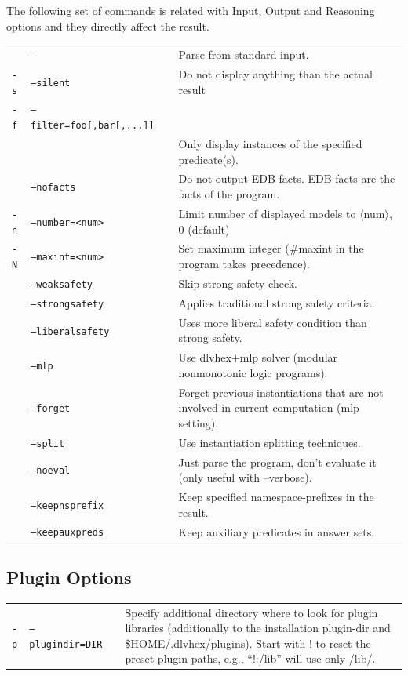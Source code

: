 \documentclass[a4paper, titlepage]{article}
\begin{document}
\bigskip
The following set of commands is related with Input, Output and  Reasoning options and they directly affect the result.
\renewcommand{\arraystretch}{1.6}
\begin{longtable}{p{2.2cm}  p{2.5cm} p{0.6cm} p{6.3cm}  } 
 & \texttt{--}& & Parse from standard input. \\ 
\texttt{-s} & \texttt{--silent}&& Do not display anything than the actual result \\ 
\texttt{-f} & \texttt{--filter=foo[,bar[,...]]} && \\
& & & Only display instances of the specified predicate(s).\\
& \texttt{--nofacts} && Do not output EDB facts. EDB facts are the facts of the program.  \\
\texttt{-n} & \texttt{--number=<num>} && Limit number of displayed models to $\langle$num$\rangle$, 0 (default)\\ 
\texttt{-N} & \texttt{--maxint=<num>} && Set maximum integer (\#maxint in the program takes precedence). \\
 & \texttt{--weaksafety} && Skip strong safety check.\\
 & \texttt{--strongsafety} && Applies traditional strong safety criteria. \\
  & \texttt{--liberalsafety} && Uses more liberal safety condition than strong safety. \\
  &\texttt{--mlp}&& Use dlvhex$+$mlp solver (modular nonmonotonic logic programs).\\
  & \texttt{--forget} && Forget previous instantiations that are not involved in current computation (mlp setting). \\
  & \texttt{--split} &&Use instantiation splitting techniques.\\
  & \texttt{--noeval} && Just parse the program, don't evaluate it (only useful with --verbose). \\
  & \texttt{--keepnsprefix} && Keep specified namespace-prefixes in the result. \\
  & \texttt{--keepauxpreds} && Keep auxiliary predicates in answer sets. \\
\end{longtable}
\bigskip
\subsection{Plugin Options}
\begin{center}
\begin{tabular}{p{2.2cm}  p{2.5cm} p{0.6cm} p{6.3cm}  } 
 \texttt{-p}&\texttt{--plugindir=DIR}&&Specify additional directory where to look for plugin libraries (additionally to the installation plugin-dir and \$HOME/.dlvhex/plugins). Start with ! to reset the preset plugin paths, e.g., ``!:/lib'' will use only /lib/.
 \\
\end{tabular}
\end{center}
\end{document}
